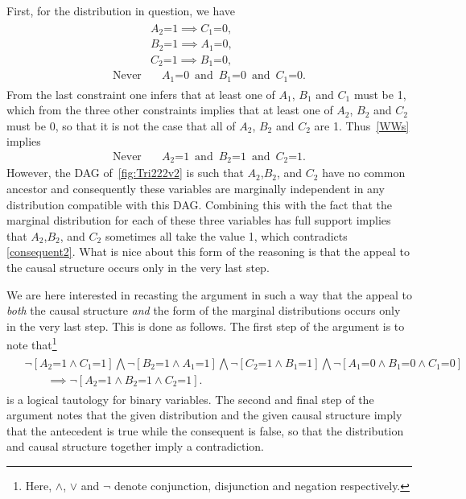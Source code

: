 \documentclass[aps,english,superscriptaddress,onecolumn,twoside,longbibliography,pra,floatfix,fleqn,nofootinbib]{revtex4-1}%
\theoremstyle{definition}
\newcommand{\cramp}[1]{\ensuremath{\mathord{#1}}}
\newcommand{\eql}{\cramp{=}}
\begin{document}
First, for the distribution in question, we have
\begin{align} 
\begin{split}\label{WWs}
&A_2 \eql 1 \implies C_1\eql 0,\\
&B_2\eql 1 \implies A_1\eql 0,\\
&C_2 \eql 1 \implies B_1 \eql 0,\\
\text{Never}  &\quad A_1 \eql 0\,\text{ and }\, B_1 \eql 0\,\text{ and }\, C_1 \eql 0.
\end{split}
\end{align}
From the last constraint one infers that at least one of $A_1$, $B_1$ and $C_1$ must be 1, which from the three other constraints implies that at least one of $A_2$, $B_2$ and $C_2$ must be 0, so that it is not the case that all of $A_2$, $B_2$ and $C_2$ are 1.  Thus~\cref{WWs} implies
\begin{align} \label{consequent2}
\text{Never}  \quad &A_2 \eql 1\,\text{ and }\, B_2 \eql 1\,\text{ and }\, C_2 \eql 1.
\end{align}
However, the DAG of~\cref{fig:Tri222v2} is such that $A_2$,$B_2$, and $C_2$ have no common ancestor and consequently these variables are marginally independent in any distribution compatible with this DAG.  Combining this with the fact that the marginal distribution for each of these three variables has full support implies that $A_2$,$B_2$, and $C_2$ sometimes all take the value 1, which contradicts \cref{consequent2}.  What is nice about this form of the reasoning is that the appeal to the causal structure occurs only in the very last step.  

We are here interested in recasting the argument in such a way that the appeal to {\em both} the causal structure {\em and} the form of the marginal distributions occurs only in the very last step.  This is done as follows.  The first step of the argument is to note that\footnote{Here, $\land$, $\lor$ and $\lnot$ denote conjunction, disjunction and negation respectively.}
\begin{align}\begin{split}\label{tautology1}
&\lnot [A_2 \eql 1 \land C_1 \eql 1] \bigwedge \lnot [B_2 \eql 1 \land A_1 \eql 1] \bigwedge \lnot [C_2 \eql 1 \land B_1 \eql 1] \bigwedge \lnot [A_1 \eql 0 \land B_1 \eql 0 \land C_1 \eql 0]\\
 &\qquad\implies
\lnot [A_2 \eql 1 \land B_2 \eql 1 \land C_2 \eql 1].
\end{split}\end{align}
is a logical tautology for binary variables. The second and final step of the argument notes that the given distribution and the given causal structure imply that the antecedent is true while the consequent is false, so that the distribution and causal structure together imply a contradiction.
\end{document}
